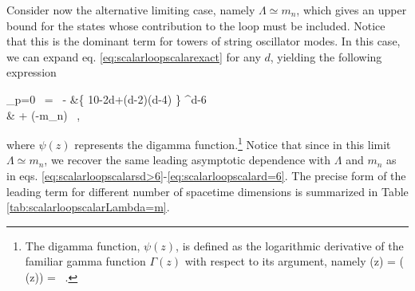 Consider now the alternative limiting case, namely $\Lambda \simeq m_n$, which gives an upper bound for the states whose contribution to the loop must be included. Notice that this is the dominant term for towers of string oscillator modes. In this case, we can expand eq. \eqref{eq:scalarloopscalarexact} for any $d$, yielding the following expression
%
\beq
		\begin{split}
			 \bigg\rvert_{p=0} \, = \, -     &\left\{ 10-2d+(d-2)(d-4)  \right\} \Lambda^{d-6}   \\
			& \quad + (\Lambda-m_n)   \, ,
		\end{split}
\label{eq:scalarloopscalarLambda=m}
\eeq
%  
where $\psi(z)$ represents the digamma function.\footnote{The digamma function, $\psi(z)$, is defined as the logarithmic derivative of the familiar gamma function $\Gamma(z)$ with respect to its argument, namely
%
\beq
			\notag \psi(z) =  \log \left( \Gamma(z)\right) = \, .
\eeq
%
} Notice that since in this limit $\Lambda \simeq m_n$, we recover the same leading asymptotic dependence with $\Lambda$ and $m_n$ as in eqs. \eqref{eq:scalarloopscalarsd>6}-\eqref{eq:scalarloopscalard=6}. The precise form of the leading term for different number of spacetime dimensions is summarized in Table \ref{tab:scalarloopscalarLambda=m}.
